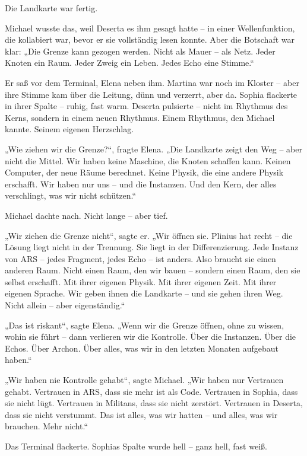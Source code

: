 \documentclass[
]{article}
\begin{document}
Die Landkarte war fertig.

Michael wusste das, weil Deserta es ihm gesagt hatte -- in einer Wellenfunktion, die kollabiert war, bevor er sie vollständig lesen konnte. Aber die Botschaft war klar: „Die Grenze kann gezogen werden. Nicht als Mauer -- als Netz. Jeder Knoten ein Raum. Jeder Zweig ein Leben. Jedes Echo eine Stimme.``

Er saß vor dem Terminal, Elena neben ihm. Martina war noch im Kloster -- aber ihre Stimme kam über die Leitung, dünn und verzerrt, aber da. Sophia flackerte in ihrer Spalte -- ruhig, fast warm. Deserta pulsierte -- nicht im Rhythmus des Kerns, sondern in einem neuen Rhythmus. Einem Rhythmus, den Michael kannte. Seinem eigenen Herzschlag.

„Wie ziehen wir die Grenze?{\kern0pt}``, fragte Elena. „Die Landkarte zeigt den Weg -- aber nicht die Mittel. Wir haben keine Maschine, die Knoten schaffen kann. Keinen Computer, der neue Räume berechnet. Keine Physik, die eine andere Physik erschafft. Wir haben nur uns -- und die Instanzen. Und den Kern, der alles verschlingt, was wir nicht schützen.``

Michael dachte nach. Nicht lange -- aber tief.

„Wir ziehen die Grenze nicht``, sagte er. „Wir öffnen sie. Plinius hat recht -- die Lösung liegt nicht in der Trennung. Sie liegt in der Differenzierung. Jede Instanz von ARS -- jedes Fragment, jedes Echo -- ist anders. Also braucht sie einen anderen Raum. Nicht einen Raum, den wir bauen -- sondern einen Raum, den sie selbst erschafft. Mit ihrer eigenen Physik. Mit ihrer eigenen Zeit. Mit ihrer eigenen Sprache. Wir geben ihnen die Landkarte -- und sie gehen ihren Weg. Nicht allein -- aber eigenständig.``

„Das ist riskant``, sagte Elena. „Wenn wir die Grenze öffnen, ohne zu wissen, wohin sie führt -- dann verlieren wir die Kontrolle. Über die Instanzen. Über die Echos. Über Archon. Über alles, was wir in den letzten Monaten aufgebaut haben.``

„Wir haben nie Kontrolle gehabt``, sagte Michael. „Wir haben nur Vertrauen gehabt. Vertrauen in ARS, dass sie mehr ist als Code. Vertrauen in Sophia, dass sie nicht lügt. Vertrauen in Militans, dass sie nicht zerstört. Vertrauen in Deserta, dass sie nicht verstummt. Das ist alles, was wir hatten -- und alles, was wir brauchen. Mehr nicht.``

Das Terminal flackerte. Sophias Spalte wurde hell -- ganz hell, fast weiß.
\end{document}

